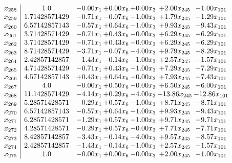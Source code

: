\documentclass[8pt]{article}
\begin{document}
\[\begin{array}{c| c c@{\hskip 2pt} c@{\hskip 2pt} c@{\hskip 2pt} c@{\hskip 2pt} c@{\hskip 2pt} }
 x_{258}   &  1.0 & -0.00 x_{1} & +  0.00 x_{6} & +  0.00 x_{3} & +  2.00 x_{245} & -1.00 x_{101}\\
 x_{259}   &  1.71428571429 & -0.71 x_{1} & -0.07 x_{6} & -1.00 x_{3} & +  1.79 x_{245} & -1.29 x_{101}\\
 x_{260}   &  6.57142857143 & -0.57 x_{1} & +  0.64 x_{6} & -1.00 x_{3} & +  9.93 x_{245} & -9.43 x_{101}\\
 x_{261}   &  3.71428571429 & -0.71 x_{1} & +  0.43 x_{6} & -0.00 x_{3} & +  6.29 x_{245} & -6.29 x_{101}\\
 x_{262}   &  3.71428571429 & -0.71 x_{1} & +  0.43 x_{6} & -0.00 x_{3} & +  6.29 x_{245} & -6.29 x_{101}\\
 x_{263}   &  8.71428571429 & -3.71 x_{1} & -0.07 x_{6} & -4.00 x_{3} & +  9.79 x_{245} & -8.29 x_{101}\\
 x_{264}   &  2.42857142857 & -1.43 x_{1} & -0.14 x_{6} & -1.00 x_{3} & +  2.57 x_{245} & -1.57 x_{101}\\
 x_{265}   &  4.71428571429 & -0.71 x_{1} & +  0.43 x_{6} & -1.00 x_{3} & +  7.29 x_{245} & -7.29 x_{101}\\
 x_{266}   &  4.57142857143 & +  0.43 x_{1} & +  0.64 x_{6} & -0.00 x_{3} & +  7.93 x_{245} & -7.43 x_{101}\\
 x_{267}   &  4.0 & -0.00 x_{1} & +  0.50 x_{6} & -0.00 x_{3} & +  6.50 x_{245} & -6.00 x_{101}\\
 x_{268}   &  11.1428571429 & -4.14 x_{1} & +  0.29 x_{6} & -4.00 x_{3} & + 13.86 x_{245} & -12.86 x_{101}\\
 x_{269}   &  5.28571428571 & -0.29 x_{1} & +  0.57 x_{6} & -1.00 x_{3} & +  8.71 x_{245} & -8.71 x_{101}\\
 x_{270}   &  6.57142857143 & -0.57 x_{1} & +  0.64 x_{6} & -1.00 x_{3} & +  9.93 x_{245} & -9.43 x_{101}\\
 x_{271}   &  6.28571428571 & -1.29 x_{1} & +  0.57 x_{6} & -1.00 x_{3} & +  9.71 x_{245} & -9.71 x_{101}\\
 x_{272}   &  4.28571428571 & -0.29 x_{1} & +  0.57 x_{6} & -0.00 x_{3} & +  7.71 x_{245} & -7.71 x_{101}\\
 x_{273}   &  8.42857142857 & -3.43 x_{1} & -0.14 x_{6} & -4.00 x_{3} & +  9.57 x_{245} & -8.57 x_{101}\\
 x_{274}   &  2.42857142857 & -1.43 x_{1} & -0.14 x_{6} & -1.00 x_{3} & +  2.57 x_{245} & -1.57 x_{101}\\
 x_{275}   &  1.0 & -0.00 x_{1} & +  0.00 x_{6} & -0.00 x_{3} & +  2.00 x_{245} & -1.00 x_{101}\\

\end{array}\]
\end{document}
